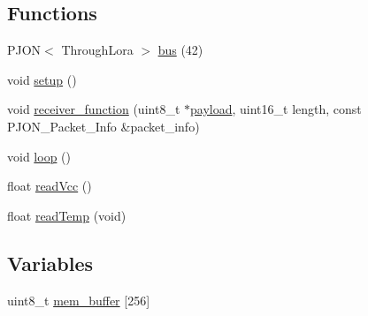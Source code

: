 \subsection*{Functions}
\begin{DoxyCompactItemize}
\item 
P\-J\-O\-N$<$ Through\-Lora $>$ \hyperlink{ARDUINO_2Local_2ThroughLoRa_2DeviceGeneric_2DeviceGeneric_8ino_a93a36dc437ea7519d2c13ae5438ad088}{bus} (42)
\item 
void \hyperlink{ARDUINO_2Local_2ThroughLoRa_2DeviceGeneric_2DeviceGeneric_8ino_a4fc01d736fe50cf5b977f755b675f11d}{setup} ()
\item 
void \hyperlink{ARDUINO_2Local_2ThroughLoRa_2DeviceGeneric_2DeviceGeneric_8ino_a76fc5e73c141f748dcc1809fdcfa1714}{receiver\-\_\-function} (uint8\-\_\-t $\ast$\hyperlink{Uno__Dragino__LoRa__GPS__Shield__TTN_8ino_a78a402d1762842473567de90b11ed256}{payload}, uint16\-\_\-t length, const P\-J\-O\-N\-\_\-\-Packet\-\_\-\-Info \&packet\-\_\-info)
\item 
void \hyperlink{ARDUINO_2Local_2ThroughLoRa_2DeviceGeneric_2DeviceGeneric_8ino_afe461d27b9c48d5921c00d521181f12f}{loop} ()
\item 
float \hyperlink{ARDUINO_2Local_2ThroughLoRa_2DeviceGeneric_2DeviceGeneric_8ino_a0b3195c3893f02cb1b80d878b89549d6}{read\-Vcc} ()
\item 
float \hyperlink{ARDUINO_2Local_2ThroughLoRa_2DeviceGeneric_2DeviceGeneric_8ino_ada109bb0cdc12131465dfe7a74f93b1e}{read\-Temp} (void)
\end{DoxyCompactItemize}
\subsection*{Variables}
\begin{DoxyCompactItemize}
\item 
uint8\-\_\-t \hyperlink{ARDUINO_2Local_2ThroughLoRa_2DeviceGeneric_2DeviceGeneric_8ino_a02235b4e96743403348a58d554caa3dc}{mem\-\_\-buffer} \mbox{[}256\mbox{]}
\end{DoxyCompactItemize}


